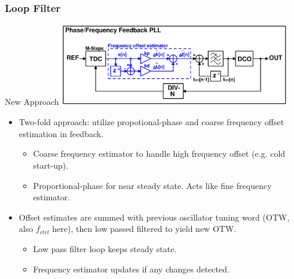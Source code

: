 \documentclass[t, screen, aspectratio=43]{beamer}
\begin{document}
\begin{frame}
	\frametitle{Loop Filter}
	\begin{block}{New Approach}
		\vspace{-0.5em}
		\center\includegraphics[width=0.75\textwidth, angle=0]{more_advanced.pdf}
		\vspace{-0.5em}
		\begin{itemize}
			\footnotesize
			\item Two-fold approach: utilize propotional-phase and coarse frequency offset estimation in feedback.
			\begin{itemize}
				\scriptsize
				\item Coarse frequency estimator to handle high frequency offset (e.g. cold start-up).	
				\item Proportional-phase for near steady state. Acts like fine frequency estimator.
			\end{itemize}
			\item Offset estimates are summed with previous oscillator tuning word (OTW, also $f_{ctrl}$ here), then low passed filtered to yield new OTW. 
			\begin{itemize}
				\scriptsize
				\item Low pass filter loop keeps steady state.	
				\item Frequency estimator updates if any changes detected.
			\end{itemize}			
		\end{itemize} 	
	\end{block}
\end{frame}
\end{document}
